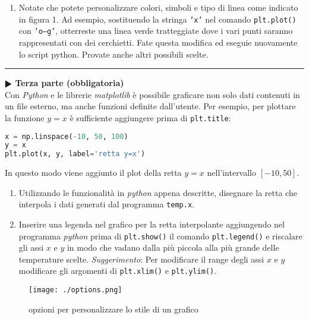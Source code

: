\documentclass[11pt]{article}
\begin{document}
\begin{enumerate}
\item Notate che potete personalizzare colori, simboli e tipo di linea come indicato in figura 1. Ad
  esempio, sostituendo la stringa \texttt{'x'} nel comando \texttt{plt.plot()} con \texttt{'o--g'}, otterreste una linea verde
 tratteggiate dove i vari punti saranno rappresentati con dei cerchietti. Fate questa modifica ed eseguie
 nuovamente lo script python. Provate anche altri possibili scelte.

\end{enumerate}


\hrule
\vspace{2mm}\textbf{$\RHD$ Terza parte (obbligatoria)\\}
%
Con {\it Python\/} e le librerie {\it matplotlib\/} \`e possibile graficare non solo dati contenuti in un file esterno, ma anche funzioni definite dall'utente. Per esempio, 
per plottare la funzione $y=x$ \`e sufficiente aggiungere prima di \texttt{plt.title}: 
\begin{lstlisting}[language=python]
x = np.linspace(-10, 50, 100)
y = x
plt.plot(x, y, label='retta y=x')
\end{lstlisting}
In questo modo viene aggiunto il plot della retta $y=x$ nell'intervallo $[-10,50]$. 

\begin{enumerate}
  \item Utilizzando le funzionalit\`a in {\it python\/} appena descritte, disegnare la retta che interpola i dati generati dal programma \texttt{temp.x}.
\item 
Inserire una legenda nel grafico per la retta interpolante aggiungendo nel programma \textit{python} prima di 
\lstinline[language=python]!plt.show()! 
il comando \lstinline[language=python]!plt.legend()! e riscalare gli assi $x$ e $y$ in modo che vadano dalla più piccola alla più grande delle temperature scelte. {\em Suggerimento}: Per modificare il range degli assi $x$ e $y$ modificare gli argomenti di \texttt{plt.xlim()} e \texttt{plt.ylim()}.
\end{enumerate}  
\begin{figure}[!h]
\texttt{[image: ./options.png]}
\caption{opzioni per personalizzare lo stile di un grafico}
\label{fig:fig1}
\end{figure}
\end{document}

